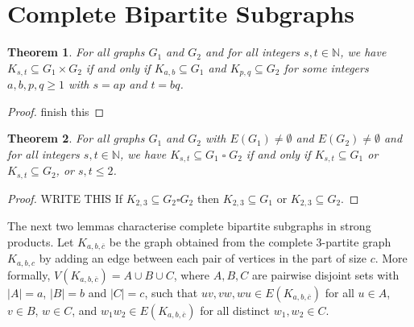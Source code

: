 \documentclass[a4paper,11pt]{article}
\theoremstyle{plain}
\newtheorem{thm}{Theorem}
\newtheorem{lem}[thm]{Lemma}
\newtheorem{cor}[thm]{Corollary}
\theoremstyle{definition}
\newcommand{\N}{\mathbb{N}}
\renewcommand{\leq}{\leqslant}
\renewcommand{\geq}{\geqslant}
\newcommand{\CartProd}{\mathbin{\square}}
\begin{document}
\section{Complete Bipartite Subgraphs}


\begin{thm} 
	For all graphs $G_1$ and $G_2$ and for all integers $s,t\in\N$, we have $K_{s,t}\subseteq  G_1\times G_2$ if and only if $K_{a,b} \subseteq G_1$ and $K_{p,q}\subseteq G_2$ for some integers $a,b,p,q\geq 1$ with $s=ap$ and $t=bq$. 
\end{thm}	

\begin{proof}
	finish this
\end{proof}


\begin{thm} 
	For all graphs $G_1$ and $G_2$ with $E(G_1)\neq\emptyset$ and $E(G_2)\neq\emptyset$ and for all integers $s,t\in\N$, we have $K_{s,t}\subseteq  G_1\CartProd G_2$ if and only if $K_{s,t} \subseteq G_1$ or $K_{s,t}\subseteq G_2$, or $s,t\leq 2$. 
\end{thm}	

\begin{proof} 
	WRITE THIS
	If $K_{2,3} \subseteq G_2 \square G_2$ then $K_{2,3} \subseteq G_1$ or $K_{2,3}\subseteq G_2$. 
\end{proof}




The next two lemmas characterise complete bipartite subgraphs in strong products. Let $K_{a,b,\overline{c}}$ be the graph obtained from the complete 3-partite graph $K_{a,b,c}$ by adding an edge between each pair of vertices in the part of size $c$. More formally, $V(K_{a,b,\overline{c}})=A\cup B\cup C$, where $A,B,C$ are pairwise disjoint sets with $|A|=a$, $|B|=b$ and $|C|=c$, such that $uv,vw,wu\in E(K_{a,b,\overline{c}})$ for all $u\in A$, $v\in B$, $w\in C$, and $w_1w_2\in E(K_{a,b,\overline{c}})$ for all distinct $w_1,w_2\in C$. 
\end{document}
